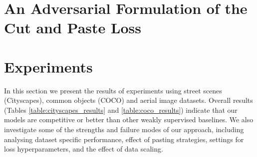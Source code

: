 \documentclass[runningheads]{llncs}
\begin{document}
%

\section{An Adversarial Formulation of the Cut and Paste Loss}


\section{Experiments}
In this section we present the results of experiments using street scenes (Cityscapes), common objects (COCO) and aerial image datasets. Overall results (Tables \ref{table:cityscapes_results} and \ref{table:coco_results}) indicate that 
our models are competitive
or better than other weakly supervised baselines.
We also investigate some of the strengths and failure modes of our approach, including analysing dataset specific performance, effect of pasting strategies, settings for loss hyperparameters, and the effect of data scaling.
\end{document}
